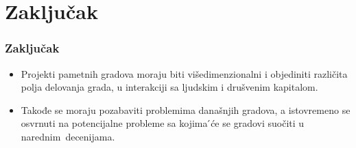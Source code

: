 \documentclass{beamer}
\begin{document}
\section{Zaključak}

\begin{frame}[fragile]\frametitle{Zaključak}
	\begin{itemize}
	\item Projekti pametnih gradova moraju biti višedimenzionalni i objediniti različita polja delovanja grada, u interakciji sa ljudskim i drušvenim    kapitalom. 
    	\item Takođe se moraju pozabaviti problemima današnjih gradova, a istovremeno se osvrnuti na potencijalne probleme sa kojima  ́će se gradovi suočiti u narednim decenijama.
	\end{itemize}
\end{frame}
\end{document}
